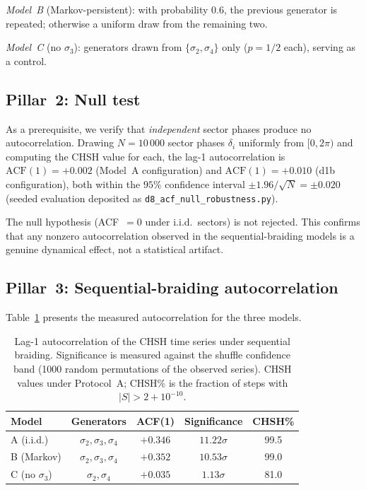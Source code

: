 \documentclass[aps,pra,twocolumn,superscriptaddress,longbibliography,floatfix,nofootinbib]{revtex4-2}
\begin{document}
\emph{Model~B} (Markov-persistent):
with probability $0.6$, the previous generator is repeated;
otherwise a uniform draw from the remaining two.

\emph{Model~C} (no $\sigma_3$):
generators drawn from $\{\sigma_2,\sigma_4\}$ only ($p=1/2$ each),
serving as a control.

\subsection{Pillar~2: Null test}

As a prerequisite, we verify that \emph{independent} sector phases
produce no autocorrelation.
Drawing $N=10\,000$ sector phases $\delta_i$
uniformly from $[0,2\pi)$ and computing the CHSH value for each,
the lag-1 autocorrelation is
$\text{ACF}(1) = +0.002$ (Model~A configuration) and
$\text{ACF}(1) = +0.010$ (d1b configuration),
both within the $95\%$ confidence interval
$\pm 1.96/\sqrt{N} = \pm 0.020$
(seeded evaluation deposited as
\texttt{d8\_acf\_null\_robustness.py}).

The null hypothesis (ACF~$=0$ under i.i.d.\ sectors) is not
rejected.
This confirms that any nonzero autocorrelation observed in the
sequential-braiding models is a genuine dynamical effect, not
a statistical artifact.

\subsection{Pillar~3: Sequential-braiding autocorrelation}

Table~\ref{tab:acf} presents the measured autocorrelation for the
three models.

\begin{table}[!htb]
\caption{%
Lag-1 autocorrelation of the CHSH time series under sequential
braiding.
Significance is measured against the shuffle confidence band
(1000 random permutations of the observed series). CHSH values under
Protocol~A; CHSH\% is the fraction of steps with $|S| > 2 + 10^{-10}$. }
\label{tab:acf}
\begin{ruledtabular}
\begin{tabular}{lcccc}
Model & Generators & ACF(1) & Significance & CHSH\% \\
\hline
A (i.i.d.) & $\sigma_2,\sigma_3,\sigma_4$ & $+0.346$ & $11.22\sigma$ & 99.5 \\
B (Markov) & $\sigma_2,\sigma_3,\sigma_4$ & $+0.352$ & $10.53\sigma$ & 99.0 \\
C (no $\sigma_3$) & $\sigma_2,\sigma_4$ & $+0.035$ & $1.13\sigma$ & 81.0 \\
\end{tabular}
\end{ruledtabular}
\end{table}
\end{document}
